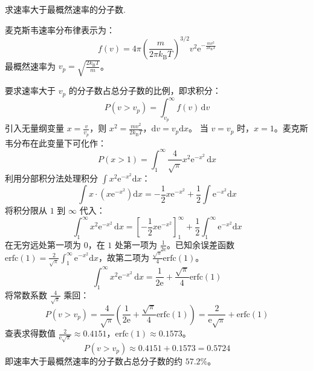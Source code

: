 \begin{exercise}\label{ex:13.6}
求速率大于最概然速率的分子数.
\end{exercise}
\begin{solution}
麦克斯韦速率分布律表示为：
$$ f(v) = 4\pi \left(\frac{m}{2\pi k_{\mathrm{B}} T}\right)^{3/2} v^2 \mathrm{e}^{-\frac{mv^2}{2k_{\mathrm{B}}T}} $$
最概然速率为 $v_p = \sqrt{\frac{2 k_{\mathrm{B}} T}{m}}$。

要求速率大于 $v_p$ 的分子数占总分子数的比例，即求积分：
$$ P(v > v_p) = \int_{v_p}^{\infty} f(v) \, \mathrm{d}v $$
引入无量纲变量 $x = \frac{v}{v_p}$，则 $x^2 = \frac{mv^2}{2k_{\mathrm{B}}T}$，$\mathrm{d}v = v_p \mathrm{d}x$。
当 $v = v_p$ 时，$x = 1$。麦克斯韦分布在此变量下可化作：
$$ P(x > 1) = \int_1^{\infty} \frac{4}{\sqrt{\pi}} x^2 \mathrm{e}^{-x^2} \, \mathrm{d}x $$
利用分部积分法处理积分 $\int x^2 \mathrm{e}^{-x^2} \mathrm{d}x$：
$$ \int x \cdot (x \mathrm{e}^{-x^2}) \mathrm{d}x = -\frac{1}{2} x \mathrm{e}^{-x^2} + \frac{1}{2} \int \mathrm{e}^{-x^2} \mathrm{d}x $$
将积分限从 $1$ 到 $\infty$ 代入：
$$ \int_1^{\infty} x^2 \mathrm{e}^{-x^2} \, \mathrm{d}x = \left[ -\frac{1}{2} x \mathrm{e}^{-x^2} \right]_1^{\infty} + \frac{1}{2} \int_1^{\infty} \mathrm{e}^{-x^2} \mathrm{d}x $$
在无穷远处第一项为 $0$，在 $1$ 处第一项为 $\frac{1}{2\mathrm{e}}$。已知余误差函数 $\mathrm{erfc}(1) = \frac{2}{\sqrt{\pi}} \int_1^{\infty} \mathrm{e}^{-x^2} \mathrm{d}x$，故第二项为 $\frac{\sqrt{\pi}}{4} \mathrm{erfc}(1)$。
$$ \int_1^{\infty} x^2 \mathrm{e}^{-x^2} \, \mathrm{d}x = \frac{1}{2\mathrm{e}} + \frac{\sqrt{\pi}}{4} \mathrm{erfc}(1) $$
将常数系数 $\frac{4}{\sqrt{\pi}}$ 乘回：
$$ P(v > v_p) = \frac{4}{\sqrt{\pi}} \left( \frac{1}{2\mathrm{e}} + \frac{\sqrt{\pi}}{4} \mathrm{erfc}(1) \right) = \frac{2}{\mathrm{e}\sqrt{\pi}} + \mathrm{erfc}(1) $$
查表求得数值 $\frac{2}{\mathrm{e}\sqrt{\pi}} \approx 0.4151$，$\mathrm{erfc}(1) \approx 0.1573$。
$$ P(v > v_p) \approx 0.4151 + 0.1573 = 0.5724 $$
即速率大于最概然速率的分子数占总分子数的约 $57.2\%$。
\end{solution}

